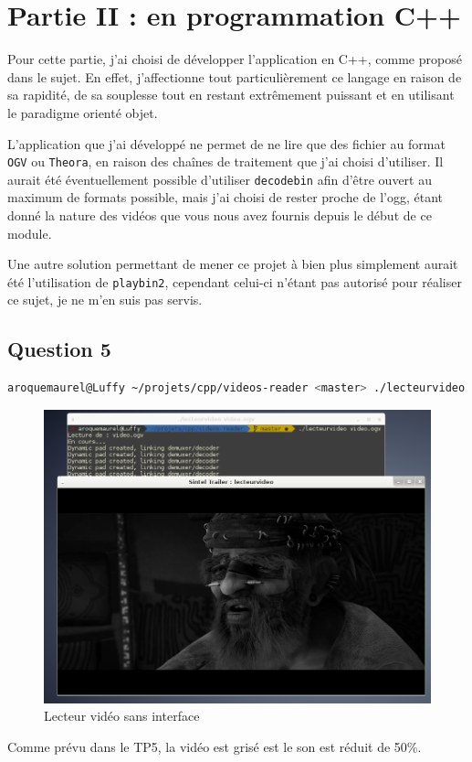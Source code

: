 \documentclass[a4paper, 11pt]{article}
\begin{document}
	\section{Partie II : en programmation C++}
	Pour cette partie, j'ai choisi de développer l'application en C++, comme proposé dans le sujet. En effet, j'affectionne tout particulièrement ce langage en
	raison de sa rapidité, de sa souplesse tout en restant extrêmement puissant et en utilisant le paradigme orienté objet.

	L'application que j'ai développé ne permet de ne lire que des fichier au format \texttt{OGV} ou \texttt{Theora}, en raison des chaînes de traitement que j'ai
	choisi d'utiliser. Il aurait été éventuellement possible
	d'utiliser \texttt{decodebin} afin d'être ouvert au
	maximum de formats possible, mais j'ai choisi de rester
	proche de l'ogg, étant donné la nature des vidéos que vous
	nous avez fournis depuis le début de ce module.

	Une autre solution permettant de mener ce projet à bien plus simplement aurait été l'utilisation de \texttt{playbin2}, cependant celui-ci n'étant pas
	autorisé pour réaliser ce sujet, je ne m'en suis pas
	servis. 

	\subsection{Question 5}
	\begin{lstlisting}[language=sh]
 aroquemaurel@Luffy ~/projets/cpp/videos-reader <master> ./lecteurvideo video.ogv 
	\end{lstlisting}
	\begin{figure}[H]
		\centering
		\includegraphics[width=17cm]{img/1.png}
		\caption{Lecteur vidéo sans interface}
	\end{figure}
	Comme prévu dans le TP5, la vidéo est grisé est le son est réduit de 50\%. 
\end{document}
